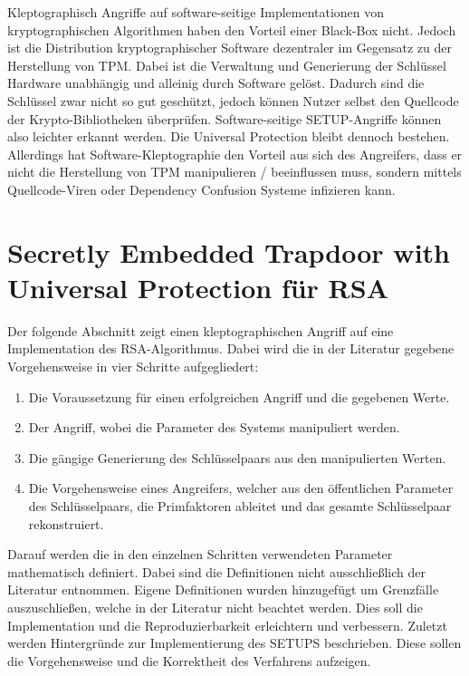         Kleptographisch Angriffe auf software-seitige Implementationen von kryptographischen Algorithmen haben den Vorteil einer Black-Box nicht. Jedoch ist die Distribution kryptographischer Software dezentraler im Gegensatz zu der Herstellung von \ac{TPM}. Dabei ist die Verwaltung und Generierung der Schlüssel Hardware unabhängig und alleinig durch Software gelöst. Dadurch sind die Schlüssel zwar nicht so gut geschützt, jedoch können  Nutzer selbst den Quellcode der Krypto-Bibliotheken überprüfen. Software-seitige \ac{SETUP}-Angriffe können also leichter erkannt werden. Die Universal Protection bleibt dennoch bestehen. Allerdings hat Software-Kleptographie den Vorteil aus sich des Angreifers, dass er nicht die Herstellung von \ac{TPM} manipulieren / beeinflussen muss, sondern mittels Quellcode-Viren oder Dependency Confusion Systeme infizieren kann.

    \section{Secretly Embedded Trapdoor with Universal Protection für RSA}
        Der folgende Abschnitt zeigt einen kleptographischen Angriff auf eine Implementation des \ac{RSA}-Algorithmus. Dabei wird die in der Literatur gegebene Vorgehensweise in vier Schritte aufgegliedert:
        \begin{enumerate}
            \item Die Voraussetzung für einen erfolgreichen Angriff und die gegebenen Werte.
            \item Der Angriff, wobei die Parameter des Systems manipuliert werden.
            \item Die gängige Generierung des Schlüsselpaars aus den manipulierten Werten.
            \item Die Vorgehensweise eines Angreifers, welcher aus den öffentlichen Parameter des Schlüsselpaars, die Primfaktoren ableitet und das gesamte Schlüsselpaar rekonstruiert.
        \end{enumerate}
        Darauf werden die in den einzelnen Schritten verwendeten Parameter mathematisch definiert. Dabei sind die Definitionen nicht ausschließlich der Literatur entnommen. Eigene Definitionen wurden hinzugefügt um Grenzfälle auszuschließen, welche in der Literatur nicht beachtet werden. Dies soll die Implementation und die Reproduzierbarkeit erleichtern und verbessern. 
        Zuletzt werden Hintergründe zur Implementierung des SETUPS beschrieben. Diese sollen die Vorgehensweise und die Korrektheit des Verfahrens aufzeigen.

